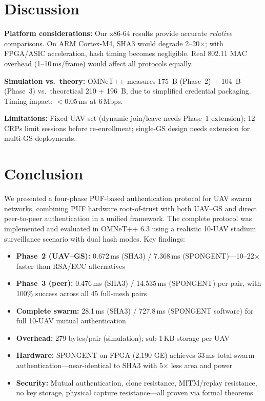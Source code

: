 \documentclass[conference]{IEEEtran}
\begin{document}
\section{Discussion}
\label{sec:discussion}

\textbf{Platform considerations:} Our x86-64 results provide accurate \emph{relative} comparisons. On ARM Cortex-M4, SHA3 would degrade 2--20$\times$; with FPGA/ASIC acceleration, hash timing becomes negligible. Real 802.11 MAC overhead (1--10\,ms/frame) would affect all protocols equally.

\textbf{Simulation vs.\ theory:} OMNeT++ measures 175~B (Phase~2) + 104~B (Phase~3) vs.\ theoretical 210 + 196~B, due to simplified credential packaging. Timing impact: $<$0.05\,ms at 6\,Mbps.

\textbf{Limitations:} Fixed UAV set (dynamic join/leave needs Phase~1 extension); 12 CRPs limit sessions before re-enrollment; single-GS design needs extension for multi-GS deployments.

\section{Conclusion}
\label{sec:conclusion}

We presented a four-phase PUF-based authentication protocol for UAV swarm networks, combining PUF hardware root-of-trust with both UAV--GS and direct peer-to-peer authentication in a unified framework. The complete protocol was implemented and evaluated in OMNeT++ 6.3 using a realistic 10-UAV stadium surveillance scenario with dual hash modes. Key findings:

\begin{itemize}[leftmargin=*,nosep]
    \item \textbf{Phase~2 (UAV--GS):} 0.672\,ms (SHA3) / 7.368\,ms (SPONGENT)---10--22$\times$ faster than RSA/ECC alternatives
    \item \textbf{Phase~3 (peer):} 0.476\,ms (SHA3) / 14.535\,ms (SPONGENT) per pair, with 100\% success across all 45 full-mesh pairs
    \item \textbf{Complete swarm:} 28.1\,ms (SHA3) / 727.8\,ms (SPONGENT software) for full 10-UAV mutual authentication
    \item \textbf{Overhead:} 279 bytes/pair (simulation); sub-1\,KB storage per UAV
    \item \textbf{Hardware:} SPONGENT on FPGA (2,190 GE) achieves 33\,ms total swarm authentication---near-identical to SHA3 with 5$\times$ less area and power
    \item \textbf{Security:} Mutual authentication, clone resistance, MITM/replay resistance, no key storage, physical capture resistance---all proven via formal theorems
\end{itemize}
\end{document}
